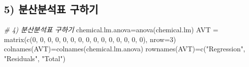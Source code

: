 \documentclass[
]{article}
\newenvironment{Shaded}{\begin{snugshade}}{\end{snugshade}}
\newcommand{\AttributeTok}[1]{\textcolor[rgb]{0.77,0.63,0.00}{#1}}
\newcommand{\CommentTok}[1]{\textcolor[rgb]{0.56,0.35,0.01}{\textit{#1}}}
\newcommand{\DecValTok}[1]{\textcolor[rgb]{0.00,0.00,0.81}{#1}}
\newcommand{\FunctionTok}[1]{\textcolor[rgb]{0.00,0.00,0.00}{#1}}
\newcommand{\NormalTok}[1]{#1}
\newcommand{\OtherTok}[1]{\textcolor[rgb]{0.56,0.35,0.01}{#1}}
\newcommand{\StringTok}[1]{\textcolor[rgb]{0.31,0.60,0.02}{#1}}
\begin{document}
\hypertarget{uxbd84uxc0b0uxbd84uxc11duxd45c-uxad6cuxd558uxae30}{%
\subsection{5) 분산분석표
구하기}\label{uxbd84uxc0b0uxbd84uxc11duxd45c-uxad6cuxd558uxae30}}

\begin{Shaded}
\begin{Highlighting}[]
\CommentTok{\# 4) 분산분석표 구하기}
\NormalTok{chemical.lm.anova}\OtherTok{=}\FunctionTok{anova}\NormalTok{(chemical.lm)}
\NormalTok{AVT }\OtherTok{=} \FunctionTok{matrix}\NormalTok{(}\FunctionTok{c}\NormalTok{(}\DecValTok{0}\NormalTok{, }\DecValTok{0}\NormalTok{, }\DecValTok{0}\NormalTok{, }\DecValTok{0}\NormalTok{, }\DecValTok{0}\NormalTok{, }\DecValTok{0}\NormalTok{, }\DecValTok{0}\NormalTok{, }\DecValTok{0}\NormalTok{, }\DecValTok{0}\NormalTok{, }\DecValTok{0}\NormalTok{, }\DecValTok{0}\NormalTok{, }\DecValTok{0}\NormalTok{, }\DecValTok{0}\NormalTok{, }\DecValTok{0}\NormalTok{, }\DecValTok{0}\NormalTok{), }\AttributeTok{nrow=}\DecValTok{3}\NormalTok{)}
\FunctionTok{colnames}\NormalTok{(AVT)}\OtherTok{=}\FunctionTok{colnames}\NormalTok{(chemical.lm.anova)}
\FunctionTok{rownames}\NormalTok{(AVT)}\OtherTok{=}\FunctionTok{c}\NormalTok{(}\StringTok{"Regression"}\NormalTok{, }\StringTok{"Residuals"}\NormalTok{, }\StringTok{"Total"}\NormalTok{)}


\end{Highlighting}
\end{Shaded}
\end{document}
